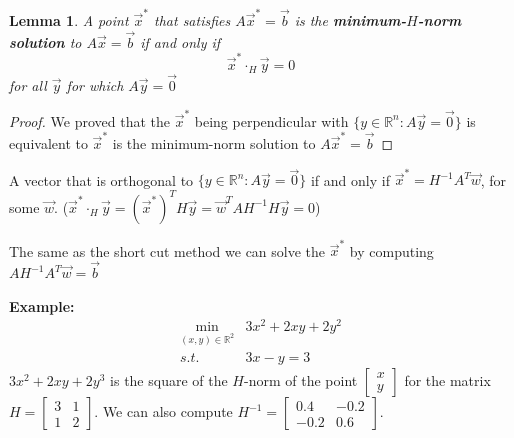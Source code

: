 \documentclass[11pt,a4paper]{article}
\newtheorem{theorem}{Theorem}
\newtheorem{lemma}{Lemma}
\begin{document}
\begin{lemma}
    A point $\vec{x}^*$ that satisfies $A \vec{x}^*= \vec{b}$ is the \textbf{minimum-$H$-norm solution} to $A \vec{x}= \vec{b}$ if and only if $$\vec{x}^*\cdot_H \vec{y}=0$$
    for all $\vec{y}$ for which $A \vec{y}=\vec{0}$
\end{lemma}
\begin{proof}
We proved that the $\vec{x}^*$ being perpendicular with $\{y\in \mathbb{R}^n: A \vec{y}= \vec{0}\}$ is equivalent to $\vec{x}^*$ is the minimum-norm solution to $A \vec{x}^*= \vec{b}$
\end{proof}
A vector that is orthogonal to $\{y\in \mathbb{R}^n: A \vec{y}= \vec{0}\}$ if and only if $\vec{x}^*=H^{-1}A^T \vec{w}$, for some $\vec{w}$. ($\vec{x}^*\cdot_H \vec{y}=(\vec{x}^*)^T H \vec{y}= \vec{w}^TAH^{-1}H\vec{y}=0$)

The same as the short cut method we can solve the $\vec{x}^*$ by computing $AH^{-1}A^T \vec{w}= \vec{b}$

\begin{center}
\end{center}

\textbf{Example:}
\begin{equation}
    \begin{aligned}
        \min_{(x,y)\in \mathbb{R}^2} &3x^2+2xy+2y^2\\
        s.t.\quad & 3x-y=3
    \end{aligned}
    \nonumber
\end{equation}
$3x^2+2xy+2y^3$ is the square of the $H$-norm of the point $\begin{bmatrix}x\\y\end{bmatrix}$ for the matrix $H=\begin{bmatrix}
    3&1\\
    1&2
\end{bmatrix}$. We can also compute $H^{-1}=\begin{bmatrix}
    0.4&-0.2\\
    -0.2&0.6
\end{bmatrix}$.
\end{document}
